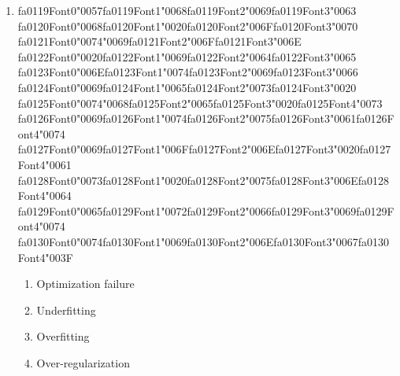 \documentclass[12pt]{article}
\begin{document}
\begin{enumerate}[label=Q\arabic*.]
 \begin{enumerate}[label=(\Alph*)]
     \item Bag-of-Words representation assumes term independence
     \item IDF overweights rare tokens
     \item Document length normalization distorts similarity
     \item Cosine similarity ignores magnitude differences
 \end{enumerate}
 
 \item {\csname fa0119Font0\endcsname\char"0057}{\csname fa0119Font1\endcsname\char"0068}{\csname fa0119Font2\endcsname\char"0069}{\csname fa0119Font3\endcsname\char"0063} {\csname fa0120Font0\endcsname\char"0068}{\csname fa0120Font1\endcsname\char"0020}{\csname fa0120Font2\endcsname\char"006F}{\csname fa0120Font3\endcsname\char"0070} {\csname fa0121Font0\endcsname\char"0074}{\char"0069}{\csname fa0121Font2\endcsname\char"006F}{\csname fa0121Font3\endcsname\char"006E} {\csname fa0122Font0\endcsname\char"0020}{\csname fa0122Font1\endcsname\char"0069}{\csname fa0122Font2\endcsname\char"0064}{\csname fa0122Font3\endcsname\char"0065} {\csname fa0123Font0\endcsname\char"006E}{\csname fa0123Font1\endcsname\char"0074}{\csname fa0123Font2\endcsname\char"0069}{\csname fa0123Font3\endcsname\char"0066} {\csname fa0124Font0\endcsname\char"0069}{\csname fa0124Font1\endcsname\char"0065}{\csname fa0124Font2\endcsname\char"0073}{\csname fa0124Font3\endcsname\char"0020} {\csname fa0125Font0\endcsname\char"0074}{\char"0068}{\csname fa0125Font2\endcsname\char"0065}{\csname fa0125Font3\endcsname\char"0020}{\csname fa0125Font4\endcsname\char"0073} {\csname fa0126Font0\endcsname\char"0069}{\csname fa0126Font1\endcsname\char"0074}{\csname fa0126Font2\endcsname\char"0075}{\csname fa0126Font3\endcsname\char"0061}{\csname fa0126Font4\endcsname\char"0074} {\csname fa0127Font0\endcsname\char"0069}{\csname fa0127Font1\endcsname\char"006F}{\csname fa0127Font2\endcsname\char"006E}{\csname fa0127Font3\endcsname\char"0020}{\csname fa0127Font4\endcsname\char"0061} {\csname fa0128Font0\endcsname\char"0073}{\csname fa0128Font1\endcsname\char"0020}{\csname fa0128Font2\endcsname\char"0075}{\csname fa0128Font3\endcsname\char"006E}{\csname fa0128Font4\endcsname\char"0064} {\csname fa0129Font0\endcsname\char"0065}{\csname fa0129Font1\endcsname\char"0072}{\csname fa0129Font2\endcsname\char"0066}{\csname fa0129Font3\endcsname\char"0069}{\csname fa0129Font4\endcsname\char"0074} {\csname fa0130Font0\endcsname\char"0074}{\csname fa0130Font1\endcsname\char"0069}{\csname fa0130Font2\endcsname\char"006E}{\csname fa0130Font3\endcsname\char"0067}{\csname fa0130Font4\endcsname\char"003F}
 \begin{enumerate}[label=(\Alph*)]
     \item Optimization failure
     \item Underfitting
     \item Overfitting
     \item Over-regularization
 \end{enumerate}
 

\end{enumerate}
\end{document}
